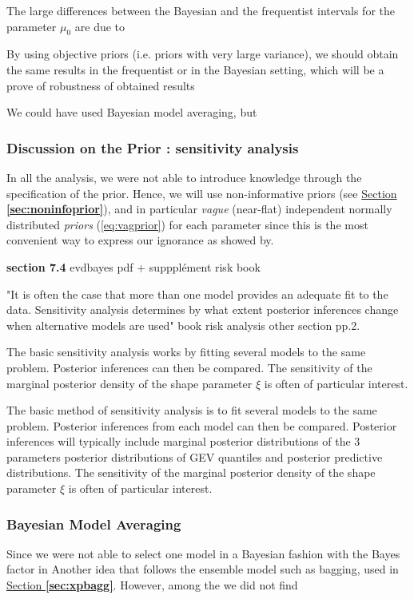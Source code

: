 The large differences between the Bayesian and the frequentist intervals for the parameter $\mu_0$ are due to 


By using objective priors (i.e. priors with very large variance), we should obtain the same results in the frequentist or in the Bayesian setting, which will be a prove of robustness of obtained results  

We could have used Bayesian model averaging, but


\subsubsection*{Discussion on the Prior : sensitivity analysis}

In all the analysis, we were not able to introduce knowledge through the specification of the prior. Hence, we will use non-informative priors (see \hyperref[sec:noninfoprior]{Section \textbf{\ref{sec:noninfoprior}}}), and in particular \emph{vague} (near-flat) independent normally distributed \emph{priors} (\ref{eq:vagprior}) for each parameter since this is the most convenient way to express our ignorance as showed by.



\textbf{section 7.4} evdbayes pdf + suppplément risk book 

"It is often the case that more than one model provides an adequate fit to the data. Sensitivity analysis determines by what extent posterior inferences change when alternative
models are used"   book risk analysis other section pp.2.

The basic sensitivity analysis works by fitting several models to
the same problem. Posterior inferences can then be compared.
The sensitivity of the
marginal posterior density of the shape parameter $\xi$ is often of particular interest.

The basic method of sensitivity analysis is to fit several models to the same problem.
Posterior inferences from each model can then be compared. Posterior inferences
will typically include marginal posterior distributions of the 3 parameters posterior distributions of GEV quantiles and posterior predictive distributions.
The sensitivity of the marginal posterior density of the shape parameter $\xi$ is often of particular interest.


\subsubsection*{Bayesian Model Averaging}\label{sec:bmaxp}

Since we were not able to select one model in a Bayesian fashion with the Bayes factor in 
Another idea that follows the ensemble model such as bagging, used in \hyperref[sec:xpbagg]{Section \textbf{\ref{sec:xpbagg}}}. However, among the  we did not find 